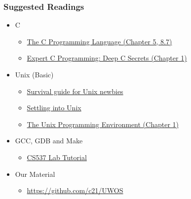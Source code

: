 \documentclass{beamer}
\begin{document}
	\begin{frame}
    \frametitle{Suggested Readings}
		\begin{itemize}
        \item \small C
        \begin{itemize}
          \item \small \href{https://www.amazon.com/Programming-Language-Prentice-Hall-Software/dp/0131103628}{The C Programming Language (Chapter 5, 8.7)}
          \item \small \href{https://www.amazon.com/Expert-Programming-Peter-van-Linden/dp/0131774298}{Expert C Programming: Deep C Secrets (Chapter 1)}
        \end{itemize}
    \end{itemize}

		\begin{itemize}
        \item \small Unix (Basic) 
				\begin{itemize}
					\item \small \href{http://matt.might.net/articles/basic-unix}{Survival guide for Unix newbies}
					\item \small \href{http://matt.might.net/articles/settling-into-unix}{Settling into Unix}
					\item \small \href{https://www.amazon.com/Unix-Programming-Environment-Prentice-Hall-Software/dp/013937681X}{The Unix Programming Environment (Chapter 1)}
			\end{itemize}	
		\end{itemize}

		\begin{itemize}
        \item \small GCC, GDB and Make
        \begin{itemize}
          \item \small \href{http://pages.cs.wisc.edu/~remzi/OSTEP/lab-tutorial.pdf}{CS537 Lab Tutorial}
        \end{itemize}
    \end{itemize}
	
		\begin{itemize}
        \item \small Our Material
        \begin{itemize}
          \item \small \url{https://github.com/c21/UWOS}
        \end{itemize}
    \end{itemize}
	\end{frame}	
\end{document}
